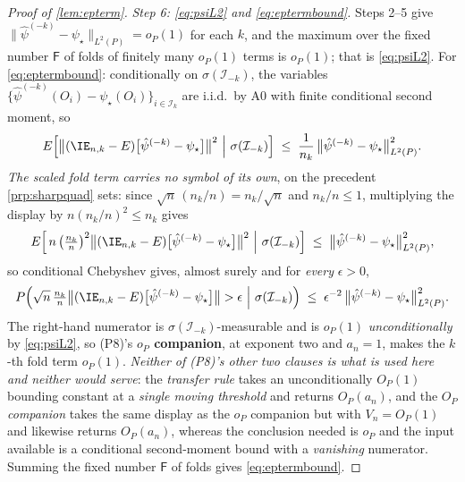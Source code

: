 \begin{proof}[Proof of \cref{lem:epterm}]
\emph{Step 6: \eqref{eq:psiL2} and \eqref{eq:eptermbound}.} Steps 2--5 give
$\|\hat\psi^{(-k)}-\psi_\star\|_{L^{2}(P)}=o_P(1)$ for each $k$, and the maximum over the fixed number
$\mathsf F$ of folds of finitely many $o_P(1)$ terms is $o_P(1)$; that is \eqref{eq:psiL2}. For
\eqref{eq:eptermbound}: conditionally on $\sigma(\mathcal I_{-k})$, the variables
$\{\hat\psi^{(-k)}(O_i)-\psi_\star(O_i)\}_{i\in\mathcal I_k}$ are i.i.d.\ by A0 with finite conditional
second moment, so
\[
E\Big[\big\|(\IE_{n,k}-E)\big[\hat\psi^{(-k)}-\psi_\star\big]\big\|^{2}\ \Big|\ \sigma(\mathcal I_{-k})\Big]
\;\le\;\frac1{n_k}\,\big\|\hat\psi^{(-k)}-\psi_\star\big\|^{2}_{L^{2}(P)} .
\]
\emph{The scaled fold term carries no symbol of its own}, on the precedent \cref{prp:sharpquad} sets: since
$\sqrt n\,(n_k/n)=n_k/\sqrt n$ and $n_k/n\le1$, multiplying the display by $n(n_k/n)^{2}\le n_k$ gives
\[
E\Big[\,n\,\big(\tfrac{n_k}{n}\big)^{2}\big\|(\IE_{n,k}-E)\big[\hat\psi^{(-k)}-\psi_\star\big]\big\|^{2}
\ \Big|\ \sigma(\mathcal I_{-k})\Big]
\;\le\;\big\|\hat\psi^{(-k)}-\psi_\star\big\|^{2}_{L^{2}(P)} ,
\]
so conditional Chebyshev gives, almost surely and for \emph{every} $\epsilon>0$,
\[
P\Big(\sqrt n\,\tfrac{n_k}{n}\big\|(\IE_{n,k}-E)\big[\hat\psi^{(-k)}-\psi_\star\big]\big\|>\epsilon
\ \Big|\ \sigma(\mathcal I_{-k})\Big)
\;\le\;\epsilon^{-2}\,\big\|\hat\psi^{(-k)}-\psi_\star\big\|^{2}_{L^{2}(P)} .
\]
The right-hand numerator is $\sigma(\mathcal I_{-k})$-measurable and is $o_P(1)$ \emph{unconditionally} by
\eqref{eq:psiL2}, so \textup{(P8)}'s \textbf{$o_P$ companion}, at exponent two and $a_n=1$, makes the $k$-th
fold term $o_P(1)$. \emph{Neither of \textup{(P8)}'s other two clauses is what is used here and neither
would serve}: the \emph{transfer rule} takes an unconditionally $O_P(1)$ bounding constant at a
\emph{single moving threshold} and returns $O_P(a_n)$, and the \emph{$O_P$ companion} takes the same
display as the $o_P$ companion but with $V_n=O_P(1)$ and likewise returns $O_P(a_n)$, whereas the
conclusion needed is $o_P$ and the input available is a conditional second-moment bound with a
\emph{vanishing} numerator. Summing the
fixed number $\mathsf F$ of folds gives \eqref{eq:eptermbound}.
\end{proof}

